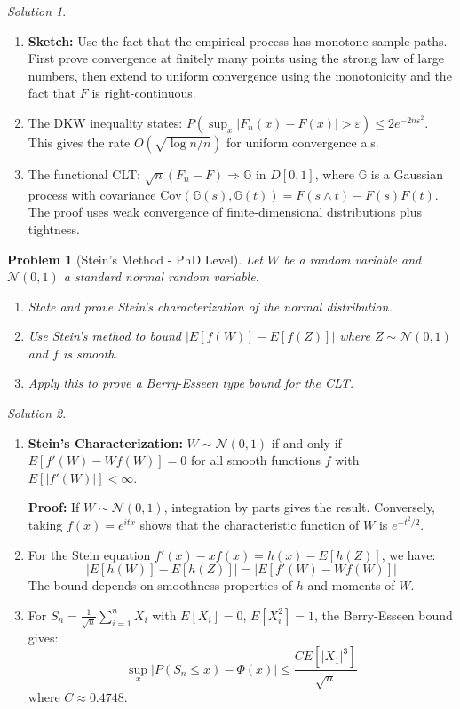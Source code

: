\documentclass[12pt,a4paper]{article}
\newtheorem{problem}{Problem}[section]
\theoremstyle{remark}
\newtheorem{solution}{Solution}[section]
\begin{document}
\begin{solution}
\begin{enumerate}[label=(\alph*)]
\item \textbf{Sketch:} Use the fact that the empirical process has monotone sample paths. First prove convergence at finitely many points using the strong law of large numbers, then extend to uniform convergence using the monotonicity and the fact that $F$ is right-continuous.

\item The DKW inequality states: $P(\sup_x |F_n(x) - F(x)| > \varepsilon) \leq 2e^{-2n\varepsilon^2}$. This gives the rate $O(\sqrt{\log n/n})$ for uniform convergence a.s.

\item The functional CLT: $\sqrt{n}(F_n - F) \Rightarrow \mathbb{G}$ in $D[0,1]$, where $\mathbb{G}$ is a Gaussian process with covariance $\text{Cov}(\mathbb{G}(s), \mathbb{G}(t)) = F(s \wedge t) - F(s)F(t)$. The proof uses weak convergence of finite-dimensional distributions plus tightness.
\end{enumerate}
\end{solution}

\begin{problem}[Stein's Method - PhD Level]
Let $W$ be a random variable and $\mathcal{N}(0,1)$ a standard normal random variable.
\begin{enumerate}[label=(\alph*)]
\item State and prove Stein's characterization of the normal distribution.
\item Use Stein's method to bound $|E[f(W)] - E[f(Z)]|$ where $Z \sim \mathcal{N}(0,1)$ and $f$ is smooth.
\item Apply this to prove a Berry-Esseen type bound for the CLT.
\end{enumerate}
\end{problem}

\begin{solution}
\begin{enumerate}[label=(\alph*)]
\item \textbf{Stein's Characterization:} $W \sim \mathcal{N}(0,1)$ if and only if $E[f'(W) - Wf(W)] = 0$ for all smooth functions $f$ with $E[|f'(W)|] < \infty$.

\textbf{Proof:} If $W \sim \mathcal{N}(0,1)$, integration by parts gives the result. Conversely, taking $f(x) = e^{itx}$ shows that the characteristic function of $W$ is $e^{-t^2/2}$.

\item For the Stein equation $f'(x) - xf(x) = h(x) - E[h(Z)]$, we have:
$$|E[h(W)] - E[h(Z)]| = |E[f'(W) - Wf(W)]|$$
The bound depends on smoothness properties of $h$ and moments of $W$.

\item For $S_n = \frac{1}{\sqrt{n}}\sum_{i=1}^n X_i$ with $E[X_i] = 0$, $E[X_i^2] = 1$, the Berry-Esseen bound gives:
$$\sup_x |P(S_n \leq x) - \Phi(x)| \leq \frac{C E[|X_1|^3]}{\sqrt{n}}$$
where $C \approx 0.4748$.
\end{enumerate}
\end{solution}
\end{document}
